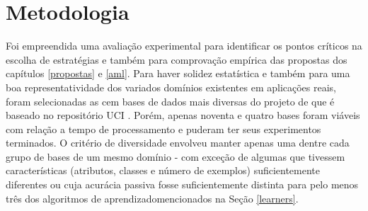 \chapter{Metodologia}\label{metodologia}
Foi empreendida uma avaliação experimental para identificar os pontos
críticos na escolha de estratégias e também para comprovação empírica das propostas
dos capítulos \ref{propostas} e \ref{aml}.
Para haver solidez estatística e também para uma boa representatividade dos
variados domínios existentes em aplicações reais, foram selecionadas as
cem bases de dados mais diversas
do projeto de \cite{doi/ucipp} que é baseado no repositório UCI \citep{bache2013uci}.
Porém, apenas noventa e quatro  bases foram viáveis com relação a
tempo de processamento e puderam ter seus experimentos terminados.
O critério de diversidade envolveu manter apenas uma dentre cada grupo de bases de um
mesmo domínio - com exceção de algumas que tivessem características
(atributos, classes e número de exemplos)
suficientemente diferentes ou cuja acurácia passiva fosse suficientemente distinta para pelo
menos três dos algoritmos de aprendizadomencionados na Seção \ref{learners}.




